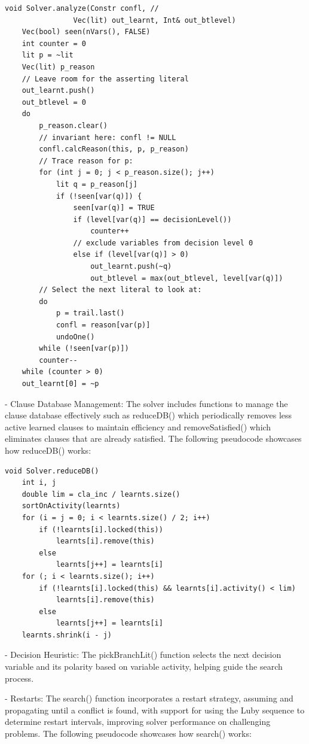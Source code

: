 \documentclass[runningheads]{llncs}
\begin{document}
\begin{lstlisting}
void Solver.analyze(Constr confl, // 
                Vec(lit) out_learnt, Int& out_btlevel)
    Vec(bool) seen(nVars(), FALSE)
    int counter = 0
    lit p = ~lit
    Vec(lit) p_reason
    // Leave room for the asserting literal
    out_learnt.push()  
    out_btlevel = 0
    do
        p_reason.clear()
        // invariant here: confl != NULL
        confl.calcReason(this, p, p_reason)  
        // Trace reason for p:
        for (int j = 0; j < p_reason.size(); j++) 
            lit q = p_reason[j]
            if (!seen[var(q)]) {
                seen[var(q)] = TRUE
                if (level[var(q)] == decisionLevel())
                    counter++
                // exclude variables from decision level 0
                else if (level[var(q)] > 0)  
                    out_learnt.push(~q)
                    out_btlevel = max(out_btlevel, level[var(q)])
        // Select the next literal to look at:
        do
            p = trail.last()
            confl = reason[var(p)]
            undoOne()
        while (!seen[var(p)])
        counter--
    while (counter > 0)
    out_learnt[0] = ~p
\end{lstlisting}

- Clause Database Management: The solver includes functions to manage the clause database effectively such as reduceDB() which periodically removes less active learned clauses to maintain efficiency and removeSatisfied() which eliminates clauses that are already satisfied\cite{sat-solver}. The following pseudocode\cite{sat-solver} showcases how reduceDB() works:

\begin{lstlisting}
void Solver.reduceDB()
    int i, j
    double lim = cla_inc / learnts.size()
    sortOnActivity(learnts)
    for (i = j = 0; i < learnts.size() / 2; i++)
        if (!learnts[i].locked(this))
            learnts[i].remove(this)
        else
            learnts[j++] = learnts[i]
    for (; i < learnts.size(); i++) 
        if (!learnts[i].locked(this) && learnts[i].activity() < lim)
            learnts[i].remove(this)
        else
            learnts[j++] = learnts[i]
    learnts.shrink(i - j)
\end{lstlisting}

- Decision Heuristic: The pickBranchLit() function selects the next decision variable and its polarity based on variable activity, helping guide the search process.

- Restarts: The search() function incorporates a restart strategy, assuming and propagating until a conflict is found, with support for using the Luby sequence to determine restart intervals, improving solver performance on challenging problems\cite{sat-solver}. The following pseudocode\cite{sat-solver} showcases how search() works:
\end{document}

